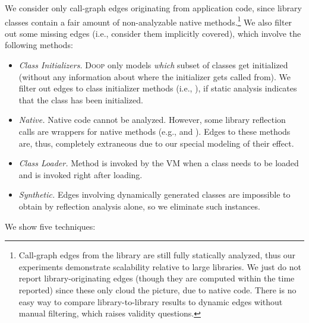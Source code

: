 We consider only call-graph edges originating from application code,
since library classes contain a fair amount of non-analyzable native
methods.\footnote{Call-graph edges from the library are still fully
  statically analyzed, thus our experiments demonstrate scalability
  relative to large libraries. We just do not report
  library-originating edges (though they are computed within the time
  reported) since these only cloud the picture, due to native
  code. There is no easy way to compare library-to-library results to
  dynamic edges without manual filtering, which raises validity
  questions.}
%
We also filter out some missing edges (i.e., consider them implicitly
covered), which involve the following methods:
\begin{itemize}
\item \emph{Class Initializers.}  \textsc{Doop} only models
  \emph{which} subset of classes get initialized (without any
  information about where the initializer gets called from). We filter
  out edges to class initializer methods (i.e., ), if
  static analysis indicates that the class has been initialized.
\item \emph{Native.} Native code cannot be analyzed. However, some
  library reflection calls are wrappers for native methods (e.g.,
   and ). Edges to these methods are,
  thus, completely extraneous due to our special modeling
  of their effect.
\item \emph{Class Loader.} Method  is invoked by the
  VM when a class needs to be loaded and  is
  invoked right after loading.
\item \emph{Synthetic.} Edges involving dynamically generated classes
  are impossible to obtain by reflection analysis alone, so we eliminate
  such instances.
\end{itemize}

%

We show five techniques:

